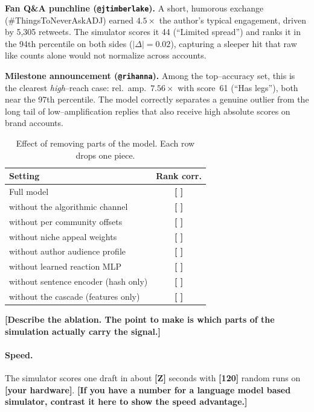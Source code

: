 \documentclass[11pt]{article}
\newcommand{\fill}[1]{\textbf{[#1]}}
\begin{document}
\noindent
\textbf{Fan Q\&A punchline (\texttt{@jtimberlake}).}
A short, humorous exchange (\#ThingsToNeverAskADJ) earned $4.5\times$ the
author's typical engagement, driven by 5{,}305 retweets. The simulator scores it
44 (``Limited spread'') and ranks it in the 94th percentile on both sides
($|\Delta| = 0.02$), capturing a sleeper hit that raw like counts alone would
not normalize across accounts.

\noindent
\textbf{Milestone announcement (\texttt{@rihanna}).}
Among the top--accuracy set, this is the clearest \emph{high}--reach case: rel.\
amp.\ $7.56\times$ with score~61 (``Has legs''), both near the 97th percentile.
The model correctly separates a genuine outlier from the long tail of
low--amplification replies that also receive high absolute scores on brand
accounts.

\begin{table}[t]
\centering
\caption{Effect of removing parts of the model. Each row drops one piece.}
\label{tab:ablation}
\begin{tabular}{lc}
\toprule
Setting & Rank corr. \\
\midrule
Full model                 & \fill{ } \\
\quad without the algorithmic channel & \fill{ } \\
\quad without per community offsets   & \fill{ } \\
\quad without niche appeal weights    & \fill{ } \\
\quad without author audience profile & \fill{ } \\
\quad without learned reaction MLP    & \fill{ } \\
\quad without sentence encoder (hash only) & \fill{ } \\
\quad without the cascade (features only) & \fill{ } \\
\bottomrule
\end{tabular}
\end{table}

\noindent
\fill{Describe the ablation. The point to make is which parts of the simulation
actually carry the signal.}

\paragraph{Speed.}
The simulator scores one draft in about \fill{Z} seconds with \fill{120} random
runs on \fill{your hardware}. \fill{If you have a number for a language model
based simulator, contrast it here to show the speed advantage.}
\end{document}
